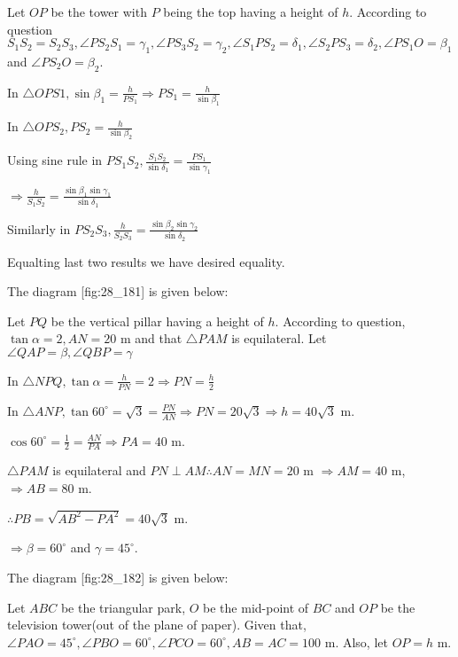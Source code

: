   Let $OP$ be the tower with $P$ being the top having a height of $h$. According to
  question $S_1S_2 = S_2S_3, \angle PS_2S_1 = \gamma_1, \angle PS_3S_2 = \gamma_2, \angle S_1PS_2 =
  \delta_1, \angle S_2PS_3 = \delta_2, \angle PS_1O = \beta_1$ and $\angle PS_2O = \beta_2$.

  In $\triangle OPS1, \sin\beta_1 = \frac{h}{PS_1} \Rightarrow PS_1 = \frac{h}{\sin\beta_1}$

  In $\triangle OPS_2, PS_2 = \frac{h}{\sin\beta_2}$

  Using sine rule in $PS_1S_2, \frac{S_1S_2}{\sin\delta_1} = \frac{PS_1}{\sin\gamma_1}$

  $\Rightarrow \frac{h}{S_1S_2} = \frac{\sin\beta_1\sin\gamma_1}{\sin\delta_1}$

  Similarly in $PS_2S_3, \frac{h}{S_2S_3} = \frac{\sin\beta_2\sin\gamma_2}{\sin\delta_2}$

  Equalting last two results we have desired equality.

\item The diagram [fig:28_181] is given below:

  \startplacefigure[reference=fig:28_181]
    \externalfigure[28_181.pdf]
  \stopplacefigure

  Let $PQ$ be the vertical pillar having a height of $h$. According to question,
  $\tan\alpha = 2, AN = 20$ m and that $\triangle PAM$ is equilateral. Let $\angle QAP
  =\beta, \angle QBP = \gamma$

  In $\triangle NPQ, \tan\alpha = \frac{h}{PN} = 2 \Rightarrow PN = \frac{h}{2}$

  In $\triangle ANP, \tan60^\circ = \sqrt{3} = \frac{PN}{AN} \Rightarrow PN = 20\sqrt{3}
  \Rightarrow h = 40\sqrt{3}$ m.

  $\cos60^\circ = \frac{1}{2} = \frac{AN}{PA} \Rightarrow PA = 40$ m.

  $\triangle PAM$ is equilateral and $PN\perp AM \therefore AN = MN = 20$ m
  $\Rightarrow AM = 40$ m, $\Rightarrow AB = 80$ m.

  $\therefore PB = \sqrt{AB^2 - PA^2} = 40\sqrt{3}$ m.

  $\Rightarrow \beta = 60^\circ$ and $\gamma = 45^\circ$.

\item The diagram [fig:28_182] is given below:

  \startplacefigure[reference=fig:28_182]
    \externalfigure[28_182.pdf]
  \stopplacefigure

  Let $ABC$ be the triangular park, $O$ be the mid-point of $BC$ and $OP$ be the
  television tower(out of the plane of paper). Given that, $\angle PAO = 45^\circ, \angle PBO =
  60^\circ, \angle PCO = 60^\circ, AB = AC = 100$ m. Also, let $OP = h$ m.

